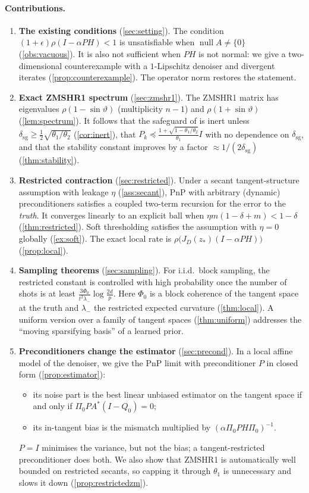 \documentclass[11pt]{article}
\theoremstyle{definition}
\theoremstyle{remark}
\newcommand{\nul}{\operatorname{null}}
\newcommand{\dsg}{\delta_{\mathrm{sg}}}
\begin{document}
\paragraph{Contributions.}
\begin{enumerate}
\item \textbf{The existing conditions} (\cref{sec:setting}). The condition $(1+\epsilon)\rho(I-\alpha PH)<1$ is
  unsatisfiable when $\nul A\neq\{0\}$ (\cref{obs:vacuous}). It is also not sufficient when $PH$ is not normal: we
  give a two-dimensional counterexample with a $1$-Lipschitz denoiser and divergent iterates
  (\cref{prop:counterexample}). The operator norm restores the statement.
\item \textbf{Exact ZMSHR1 spectrum} (\cref{sec:zmshr1}). The ZMSHR1 matrix has eigenvalues
  $\rho(1-\sin\vartheta)$ (multiplicity $n-1$) and $\rho(1+\sin\vartheta)$ (\cref{lem:spectrum}). It follows that
  the safeguard of \cite{hong2024p2np} is inert unless $\dsg\geq\tfrac12\sqrt{\theta_1/\theta_2}$
  (\cref{cor:inert}), that $P_k\preceq\frac{1+\sqrt{1-\theta_1/\theta_2}}{\theta_1}I$ with no dependence on
  $\dsg$, and that the stability constant improves by a factor $\approx1/(2\dsg)$ (\cref{thm:stability}).
\item \textbf{Restricted contraction} (\cref{sec:restricted}). Under a secant tangent-structure assumption with
  leakage $\eta$ (\cref{ass:secant}), PnP with arbitrary (dynamic) preconditioners satisfies a coupled
  two-term recursion for the error to the \emph{truth}. It converges linearly to an explicit ball when
  $\eta m(1-\delta+m)<1-\delta$ (\cref{thm:restricted}). Soft thresholding satisfies the assumption with
  $\eta=0$ globally (\cref{ex:soft}). The exact local rate is
  $\rho\big(J_D(z_*)(I-\alpha PH)\big)$ (\cref{prop:local}).
\item \textbf{Sampling theorems} (\cref{sec:sampling}). For i.i.d.\ block sampling, the restricted constant is
  controlled with high probability once the number of shots is at least
  $\frac{3\Phi_0}{t^2\lambda_-}\log\frac{2d}{p}$. Here $\Phi_0$ is a block coherence of the tangent space at the
  truth and $\lambda_-$ the restricted expected curvature (\cref{thm:local}). A uniform version over a family of
  tangent spaces (\cref{thm:uniform}) addresses the ``moving sparsifying basis'' of a learned prior.
\item \textbf{Preconditioners change the estimator} (\cref{sec:precond}). In a local affine model of the
  denoiser, we give the PnP limit with preconditioner $P$ in closed form (\cref{prop:estimator}):
  \begin{itemize}
  \item its noise part is the best linear unbiased estimator on the tangent space if and only if
    $\Pi_0PA^*(I-Q_0)=0$;
  \item its in-tangent bias is the mismatch multiplied by $(\alpha\Pi_0PH\Pi_0)^{-1}$.
  \end{itemize}
  $P=I$ minimises the variance, but not the bias; a tangent-restricted preconditioner does both. We also show that ZMSHR1 is automatically well bounded
  on restricted secants, so capping it through $\theta_1$ is unnecessary and slows it down
  (\cref{prop:restrictedzm}).
\end{enumerate}
\end{document}
